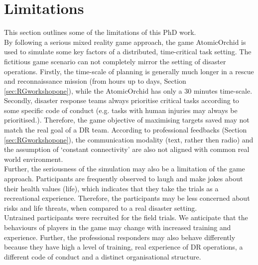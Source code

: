 
\section{Limitations}
This section outlines some of the limitations of this PhD work. \\

By following a serious mixed reality game approach, the game AtomicOrchid is used to simulate some key factors of a distributed, time-critical task setting.  The fictitious game scenario can not completely mirror the setting of disaster operations. Firstly, the time-scale of planning is generally much longer in a rescue and reconnaissance mission (from hours up to days, Section \ref{sec:RGworkshopone}), while the AtomicOrchid has only a 30 minutes time-scale. Secondly, disaster response teams always prioritise critical tasks according to some specific code of conduct (e.g. tasks with human injuries may always be prioritised.). Therefore, the game objective of maximising targets saved may not match the real goal of a \ac{DR} team. According to professional feedbacks (Section \ref{sec:RGworkshopone}), the communication modality (text, rather then radio) and the assumption of `constant connectivity' are also not aligned with common real world environment. \\

Further, the seriousness of the simulation may also be a limitation of the game approach. Participants are frequently observed to laugh and make jokes about their health values (life), which indicates that they take the trials as a recreational experience. Therefore, the participants may be less concerned about risks and life threats, when compared to a real disaster setting. \\

Untrained participants were recruited for the field trials. We anticipate that the behaviours of players in the game may change with increased training and experience. Further, the professional responders may also behave differently because they have high a level of training, real experience of \ac{DR} operations, a different code of conduct and a distinct organisational structure.\\

